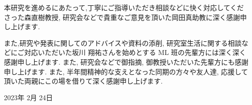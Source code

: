 \newpage
\changeindent{0cm}
\acknowledgements
\changeindent{2cm}


本研究を進めるにあたって,丁寧にご指導いただき相談などに快く対応してくださった森直樹教授, 研究会などで貴重なご意見を頂いた岡田真助教に深く感謝申し上げます.

また,研究や発表に関してのアドバイスや資料の添削, 研究室生活に関する相談などにご対応いただいた坂川 翔祐さんを始めとする ML 班の先輩方には深く深く感謝申し上げます. また, 研究会などで御指摘, 御教授いただいた先輩方にも感謝申し上げます.
また, 半年間精神的な支えとなった同期の方々や友人達, 応援して頂いた両親にこの場を借りて深く感謝申し上げます.

\begin{flushright}
  2023年  2月  24日
\end{flushright}

